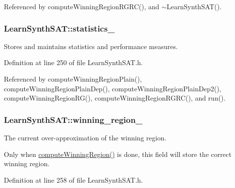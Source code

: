 Referenced by compute\-Winning\-Region\-R\-G\-R\-C(), and $\sim$\-Learn\-Synth\-S\-A\-T().

\hypertarget{classLearnSynthSAT_a2175c687276e00fa0fe3e158680affc1}{
\subsubsection[{statistics\-\_\-}]{ Learn\-Synth\-S\-A\-T\-::statistics\-\_\-\hspace{0.3cm}{\ttfamily [protected]}}}\label{classLearnSynthSAT_a2175c687276e00fa0fe3e158680affc1}


Stores and maintains statistics and performance measures. 



Definition at line 250 of file Learn\-Synth\-S\-A\-T.\-h.



Referenced by compute\-Winning\-Region\-Plain(), compute\-Winning\-Region\-Plain\-Dep(), compute\-Winning\-Region\-Plain\-Dep2(), compute\-Winning\-Region\-R\-G(), compute\-Winning\-Region\-R\-G\-R\-C(), and run().

\hypertarget{classLearnSynthSAT_aced2bce789c7a93ed4b5391dd0690616}{
\subsubsection[{winning\-\_\-region\-\_\-}]{ Learn\-Synth\-S\-A\-T\-::winning\-\_\-region\-\_\-\hspace{0.3cm}{\ttfamily [protected]}}}\label{classLearnSynthSAT_aced2bce789c7a93ed4b5391dd0690616}


The current over-\/approximation of the winning region. 

Only when \hyperlink{classLearnSynthSAT_a055b4699184d09bb7f6b15052ac684db}{compute\-Winning\-Region()} is done, this field will store the correct winning region. 

Definition at line 258 of file Learn\-Synth\-S\-A\-T.\-h.



